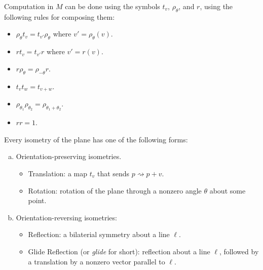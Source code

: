 \documentclass[letterpaper]{article}
\begin{document}
Computation in $M$ can be done using the symbols $t_v$, $\rho_{\theta}$, and $r$, using the following rules for composing them: 
\begin{itemize}
    \item $\rho_{\theta} t_v = t_{v'} \rho_{\theta}$ where $v' = \rho_{\theta}(v)$. 
    \item $rt_v = t_{v'}r$ where $v' = r(v)$. 
    \item $r\rho_{\theta} = \rho_{-\theta} r$. 
    \item $t_v t_w = t_{v + w}$. 
    \item $\rho_{\theta_1}\rho_{\theta_2} = \rho_{\theta_1 + \theta_2}$.
    \item $rr = 1$. 
\end{itemize}

\begin{theorem}{}{}
    Every isometry of the plane has one of the following forms: 
    \begin{enumerate}[(a)]
        \item Orientation-preserving isometries. 
        \begin{itemize}
            \item Translation: a map $t_v$ that sends $p \rightsquigarrow p + v$.
            \item Rotation: rotation of the plane through a nonzero angle $\theta$ about some point.  
        \end{itemize}

        \item Orientation-reversing isometries: 
        \begin{itemize}
            \item Reflection: a bilaterial symmetry about a line $\ell$. 
            \item Glide Reflection (or \emph{glide} for short): reflection about a line $\ell$, followed by a translation by a nonzero vector parallel to $\ell$. 
        \end{itemize}
    \end{enumerate}
\end{theorem}
\end{document}
